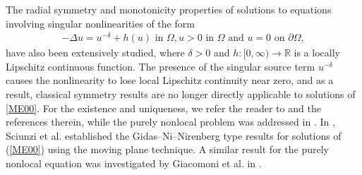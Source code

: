 \documentclass[11pt, notitlepage]{article}
\begin{document}
{The radial symmetry and monotonicity properties of solutions to equations involving singular nonlinearities of the form 
\begin{align}\label{ME00}
         -\Delta u=u^{-\delta}+h(u)\text{ in }\Omega,
        u>0\text{ in }\Omega\text{ and }u=0 \text{ on }\partial \Omega,
\end{align}
have also been extensively studied, where $\delta>0$ and $h:[0,\infty)\to\mathbb{R}$ is a locally Lipschitz continuous function. The presence of the singular source term $u^{-\delta}$ causes the nonlinearity to lose local Lipschitz continuity near zero, and as a result, classical symmetry results are no longer directly applicable to solutions of \eqref{ME00}. For the existence and uniqueness, we refer the reader to \cite{Boccardo10, Sciunzi16, CRT, LM} and the references therein, while the purely nonlocal problem was addressed in \cite{Sciunzi17}. In \cite{SciunziJDE13, SciunziNA}, Sciunzi et al. established the Gidas–Ni–Nirenberg type results for solutions of (\ref{ME00}) using the moving plane technique. A similar result for the purely nonlocal equation was investigated by Giacomoni et al. in \cite{Rakesh20}.
     
}
\end{document}
